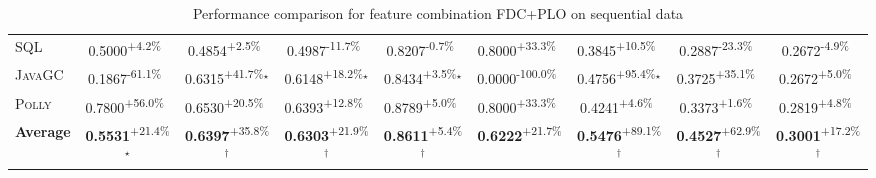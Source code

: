 \begin{table}[htbp]
\begin{tabular}{l|cccc|cccc}
\textsc{SQL} & \cellcolor{green!30}0.5000\textsuperscript{+4.2\%}$^{\,\,\,}$ & \cellcolor{green!30}0.4854\textsuperscript{+2.5\%}$^{\,\,\,}$ & \cellcolor{red!30}0.4987\textsuperscript{-11.7\%}$^{\,\,\,}$ & \cellcolor{red!30}0.8207\textsuperscript{-0.7\%}$^{\,\,\,}$ & \cellcolor{green!30}0.8000\textsuperscript{+33.3\%}$^{\,\,\,}$ & \cellcolor{green!30}0.3845\textsuperscript{+10.5\%}$^{\,\,\,}$ & \cellcolor{red!30}0.2887\textsuperscript{-23.3\%}$^{\,\,\,}$ & \cellcolor{red!30}0.2672\textsuperscript{-4.9\%}$^{\,\,\,}$ \\
\textsc{JavaGC} & \cellcolor{red!30}0.1867\textsuperscript{-61.1\%}$^{\,\,\,}$ & \cellcolor{green!30}0.6315\textsuperscript{+41.7\%}$^\star$ & \cellcolor{green!30}0.6148\textsuperscript{+18.2\%}$^\star$ & \cellcolor{green!30}0.8434\textsuperscript{+3.5\%}$^\star$ & \cellcolor{red!30}0.0000\textsuperscript{-100.0\%}$^{\,\,\,}$ & \cellcolor{green!30}0.4756\textsuperscript{+95.4\%}$^\star$ & \cellcolor{green!30}0.3725\textsuperscript{+35.1\%}$^{\,\,\,}$ & \cellcolor{green!30}0.2672\textsuperscript{+5.0\%}$^{\,\,\,}$ \\
\textsc{Polly} & \cellcolor{green!30}0.7800\textsuperscript{+56.0\%}$^{\,\,\,}$ & \cellcolor{green!30}0.6530\textsuperscript{+20.5\%}$^{\,\,\,}$ & \cellcolor{green!30}0.6393\textsuperscript{+12.8\%}$^{\,\,\,}$ & \cellcolor{green!30}0.8789\textsuperscript{+5.0\%}$^{\,\,\,}$ & \cellcolor{green!30}0.8000\textsuperscript{+33.3\%}$^{\,\,\,}$ & \cellcolor{green!30}0.4241\textsuperscript{+4.6\%}$^{\,\,\,}$ & \cellcolor{green!30}0.3373\textsuperscript{+1.6\%}$^{\,\,\,}$ & \cellcolor{green!30}0.2819\textsuperscript{+4.8\%}$^{\,\,\,}$ \\
\hline
\textbf{Average} & \cellcolor{green!30}\textbf{0.5531}\textsuperscript{+21.4\%}$^\star$ & \cellcolor{green!30}\textbf{0.6397}\textsuperscript{+35.8\%}$^\dagger$ & \cellcolor{green!30}\textbf{0.6303}\textsuperscript{+21.9\%}$^\dagger$ & \cellcolor{green!30}\textbf{0.8611}\textsuperscript{+5.4\%}$^\dagger$ & \cellcolor{green!30}\textbf{0.6222}\textsuperscript{+21.7\%}$^{\,\,\,}$ & \cellcolor{green!30}\textbf{0.5476}\textsuperscript{+89.1\%}$^\dagger$ & \cellcolor{green!30}\textbf{0.4527}\textsuperscript{+62.9\%}$^\dagger$ & \cellcolor{green!30}\textbf{0.3001}\textsuperscript{+17.2\%}$^\dagger$ \\
\hline
\end{tabular}
\caption{Performance comparison for feature combination FDC+PLO on sequential data}
\label{tab:combo_FDC_PLO_performance_sequential}
\end{table}